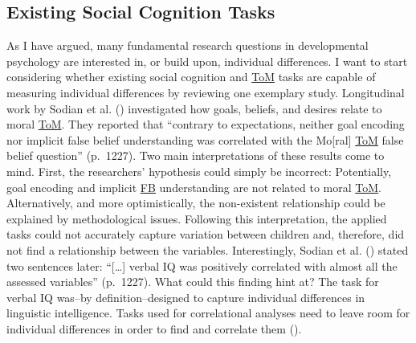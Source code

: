 \documentclass[
]{scrbook}
\begin{document}
\subsection{Existing Social Cognition Tasks}\label{existing-social-cognition-tasks}

As I have argued, many fundamental research questions in developmental psychology are interested in, or build upon, individual differences. I want to start considering whether existing social cognition and \hyperref[acronyms_ToM]{ToM} tasks are capable of measuring individual differences by reviewing one exemplary study. Longitudinal work by Sodian et al. () investigated how goals, beliefs, and desires relate to moral \hyperref[acronyms_ToM]{ToM}. They reported that ``contrary to expectations, neither goal encoding nor implicit false belief understanding was correlated with the Mo{[}ral{]} \hyperref[acronyms_ToM]{ToM} false belief question'' (p.~1227). Two main interpretations of these results come to mind. First, the researchers' hypothesis could simply be incorrect: Potentially, goal encoding and implicit \hyperref[acronyms_FB]{FB} understanding are not related to moral \hyperref[acronyms_ToM]{ToM}. Alternatively, and more optimistically, the non-existent relationship could be explained by methodological issues. Following this interpretation, the applied tasks could not accurately capture variation between children and, therefore, did not find a relationship between the variables. Interestingly, Sodian et al. () stated two sentences later: ``{[}\ldots{]} verbal IQ was positively correlated with almost all the assessed variables'' (p.~1227). What could this finding hint at? The task for verbal IQ was\thinspace --\thinspace by definition\thinspace --\thinspace designed to capture individual differences in linguistic intelligence. Tasks used for correlational analyses need to leave room for individual differences in order to find and correlate them ().
\end{document}
